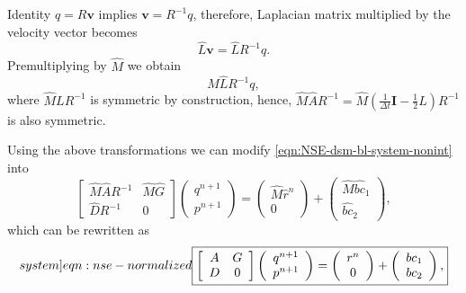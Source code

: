 \documentclass{article}
\numberwithin{equation}{section}
\begin{document}
Identity ${q}=R\boldsymbol{v}$ implies $\boldsymbol{v}=R^{-1}{q}$, therefore, Laplacian matrix multiplied by the velocity vector becomes
$$\hat{L}\boldsymbol{v}= \hat{L}R^{-1}{q}.$$ 
Premultiplying by $\hat M$ we obtain
$$\hat M\hat{L}R^{-1}{q},$$ 
where $\hat M L R^{-1}$ is symmetric by construction, hence, $\hat M\hat{A}R^{-1}=\hat M (\frac{1}{\Delta t}\mathbf{I}-\frac{1}{2}L) R^{-1}$ is also symmetric.  

Using the above transformations we can modify \cref{eqn:NSE-dsm-bl-system-nonint}
into 
\begin{equation*}
\left[\begin{array}{cc}
\hat{M}\hat{A}R^{-1} & \hat{M}\hat{G} \\
\hat{D}R^{-1} & 0
\end{array}\right]\left(\begin{array}{c}
q^{n+1} \\
p^{n+1}
\end{array}\right)=\left(\begin{array}{c}
\hat{M}\hat{r}^n \\
0
\end{array}\right)+\left(\begin{array}{c}
\hat{M}\widehat{b c}_1 \\
\widehat{b c}_2
\end{array}\right),
\end{equation*}
which can be rewritten as 
\begin{equation}\label[system]{eqn:nse-normalized}
\boxed{\left[\begin{array}{cc}
A & G \\
D & 0
\end{array}\right]\left(\begin{array}{c}
q^{n+1} \\
p^{n+1}
\end{array}\right)=\left(\begin{array}{c}
r^n \\
0
\end{array}\right)+\left(\begin{array}{c}
{b c}_1 \\
{b c}_2
\end{array}\right),}
\end{equation}
\end{document}
